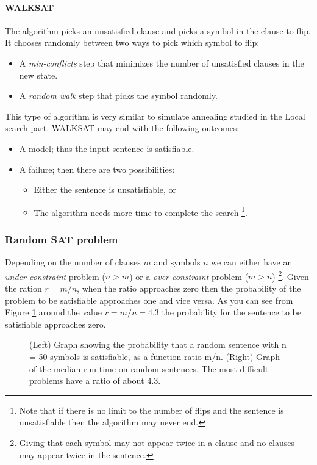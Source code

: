 \documentclass[10pt,a4paper]{article}
\begin{document}
\paragraph{WALKSAT} 
The algorithm picks an unsatisfied clause and picks a symbol in the clause to flip. It chooses randomly between two ways to pick which symbol to flip: 
\begin{itemize}
\item A \textit{min-conflicts} step that minimizes the number of unsatisfied clauses in the new state.
\item A \textit{random walk} step that picks the symbol randomly.
\end{itemize}
This type of algorithm is very similar to simulate annealing studied in the Local search part.
WALKSAT may end with the following outcomes:
\begin{itemize}
\item A model; thus the input sentence is satisfiable.
\item A failure; then there are two possibilities:

	\begin{itemize}
	\item Either the sentence is unsatisfiable, or
	\item The algorithm needs more time to complete the search \footnote{Note that if there is no limit to the number of flips and the sentence is unsatisfiable then the algorithm may never end.}.
	\end{itemize}
\end{itemize}

\subsubsection{Random SAT problem}
Depending on the number of clauses $m$ and symbols $n$ we can either have an \textit{under-constraint} problem ($n>m$) or a \textit{over-constraint} problem ($m>n$) \footnote{Giving that each symbol may not appear twice in a clause and no clauses may appear twice in the sentence.}. Given the ration $r=m/n$, when the ratio approaches zero then the probability of the problem to be satisfiable approaches one and vice versa. As you can see from Figure \ref{fig:sat} around the value $r=m/n=4.3$ the probability for the sentence to be satisfiable approaches zero.


\begin{figure}[H]
\centering
{}
\caption{(Left) Graph showing the probability that a random  sentence with n = 50 symbols is satisfiable, as a function ratio m/n. (Right) Graph of the median run time on random sentences. The most difficult problems have a ratio of about 4.3.}
\label{fig:sat}
\end{figure}
\end{document}

